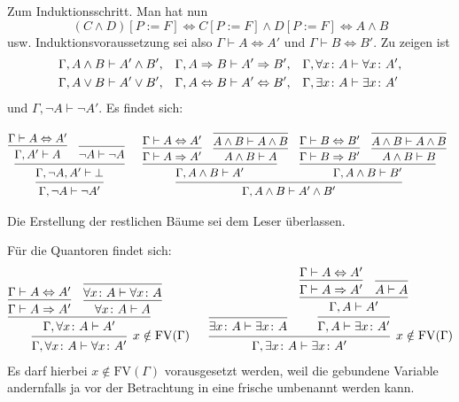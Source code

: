 \begin{Beweis}
Zum Induktionsschritt. Man hat nun
\[(C\land D)[P:=F]
\iff C[P:=F]\land D[P:=F]\iff A\land B\]
usw. Induktionsvoraussetzung sei also $\Gamma\vdash A\Leftrightarrow A'$
und $\Gamma\vdash B\Leftrightarrow B'$. Zu zeigen ist
\begin{align*}
& \Gamma,A\land B\vdash A'\land B',
&& \Gamma,A\Rightarrow B\vdash A'\Rightarrow B',
&& \Gamma,\forall x\colon A\vdash\forall x\colon A',\\
& \Gamma,A\lor B\vdash A'\lor B',
&& \Gamma,A\Leftrightarrow B\vdash A'\Leftrightarrow B',
&& \Gamma,\exists x\colon A\vdash\exists x\colon A'
\end{align*}
und $\Gamma,\lnot A\vdash\lnot A'$. Es findet sich:
\begin{small}
\[\begin{array}{@{}l@{\quad\;\;}l}
\begin{prooftree}[separation = 1em, center = false]
      \hypo{\Gamma\vdash A\bicond A'}
    \infer1{\Gamma,A'\vdash A}
    \infer0{\lnot A\vdash\lnot A}
  \infer2{\Gamma,\lnot A,A'\vdash\bot}
\infer1{\Gamma,\lnot A\vdash\lnot A'}
\end{prooftree}
&
\begin{prooftree}[separation = 1em, center = false]
      \hypo{\Gamma\vdash A\bicond A'}
    \infer1{\Gamma\vdash A\cond A'}
      \infer0{A\land B\vdash A\land B}
    \infer1{A\land B\vdash A}
  \infer2{\Gamma,A\land B\vdash A'}
      \hypo{\Gamma\vdash B\bicond B'}
    \infer1{\Gamma\vdash B\cond B'}
      \infer0{A\land B\vdash A\land B}
    \infer1{A\land B\vdash B}
  \infer2{\Gamma,A\land B\vdash B'}
\infer2{\Gamma,A\land B\vdash A'\land B'}
\end{prooftree}
\end{array}\]
\end{small}%
Die Erstellung der restlichen Bäume sei dem Leser überlassen.

Für die Quantoren findet sich:
\[
\begin{array}{@{}l@{\quad\;\;}l@{}}
\begin{prooftree}[separation = 1em, center = false]
      \hypo{\Gamma\vdash A\bicond A'}
    \infer1{\Gamma\vdash A\cond A'}
      \infer0{\forall x\colon A\vdash\forall x\colon A}
    \infer1{\forall x\colon A\vdash A}
  \infer2{\Gamma,\forall x\colon A\vdash A'}
\infer1[$x\notin\mathrm{FV}(\Gamma)$]{\Gamma,\forall x\colon A\vdash\forall x\colon A'}
\end{prooftree}
&
\begin{prooftree}[separation = 1em, center = false]
  \infer0{\exists x\colon A\vdash\exists x\colon A}
        \hypo{\Gamma\vdash A\bicond A'}
      \infer1{\Gamma\vdash A\cond A'}
      \infer0{A\vdash A}
    \infer2{\Gamma, A\vdash A'}
  \infer1{\Gamma, A\vdash\exists x\colon A'}
\infer2[$x\notin\mathrm{FV}(\Gamma)$]{\Gamma,\exists x\colon A\vdash\exists x\colon A'}
\end{prooftree}
\end{array}
\]
Es darf hierbei $x\notin\mathrm{FV}(\Gamma)$ vorausgesetzt werden, weil
die gebundene Variable andernfalls ja vor der Betrachtung in eine
frische umbenannt werden kann.\,\qedsymbol
\end{Beweis}

